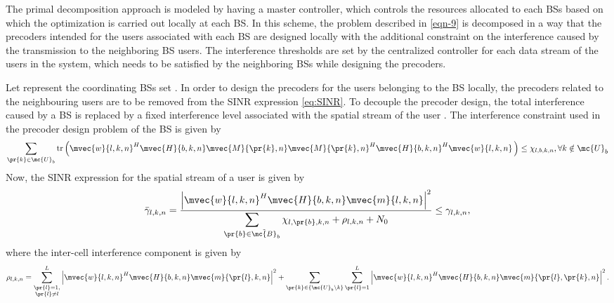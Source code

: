 The primal decomposition approach is modeled by having a master controller, which controls the resources allocated to each \acp{BS} based on which the optimization is carried out locally at each \ac{BS}. In this scheme, the problem described in \eqref{eqn-9} is decomposed in a way that the precoders intended for the users associated with each \ac{BS} are designed locally with the additional constraint on the interference caused by the transmission to the neighboring \ac{BS} users. The interference thresholds are set by the centralized controller for each data stream of the users in the system, which needs to be satisfied by the neighboring \acp{BS} while designing the precoders.

Let  represent the coordinating \acp{BS} set . In order to design the precoders for the users  belonging to the \ac{BS}  locally, the precoders related to the neighbouring users  are to be removed from the \ac{SINR} expression \eqref{eq:SINR}. To decouple the precoder design, the total interference caused by a \ac{BS}  is replaced by a fixed interference level  associated with the  spatial stream of the user . The interference constraint used in the precoder design problem of the \ac{BS}  is given by
\begin{equation}
\sum_{\pr{k} \in \mc{U}_b} \text{tr} \left ( \mvec{w}{l,k,n}^H \mvec{H}{b,k,n} \mvec{M}{\pr{k},n} \mvec{M}{\pr{k},n}^H \mvec{H}{b,k,n}^H \mvec{w}{l,k,n} \, \right ) \leq \chi_{l,b,k,n}, \forall k \notin \mc{U}_b
\label{eq-primal-constr}
\end{equation}
Now, the \ac{SINR} expression for the spatial stream  of a user  is given by
\begin{equation}\label{eq:SINR-primal}
\bar{\gamma}_{l,k,n} = \frac{\left | \mvec{w}{l,k,n}^H \mvec{H}{b,k,n} \mvec{m}{l,k,n} \right |^2}{\displaystyle \sum_{\pr{b} \in \tilde{\mc{B}}_{b} } \chi_{l,\pr{b},k,n} + \rho_{l,k,n} + N_0} \leq \gamma_{l,k,n},
\end{equation}
where the inter-cell interference component  is given by
\begin{equation}
\rho_{l,k,n} = \sum_{\substack{\pr{l} = 1 ,\\ \pr{l} \neq l}}^L \left | \mvec{w}{l,k,n}^H \mvec{H}{b,k,n} \mvec{m}{\pr{l},k,n} \right |^2 + \sum_{\pr{k} \in \{\mc{U}_{b} \backslash k \}} \sum_{\pr{l}=1}^L \left | \mvec{w}{l,k,n}^H \mvec{H}{b,k,n} \mvec{m}{\pr{l},\pr{k},n} \right |^2.
\label{eqn-rho}
\end{equation}

